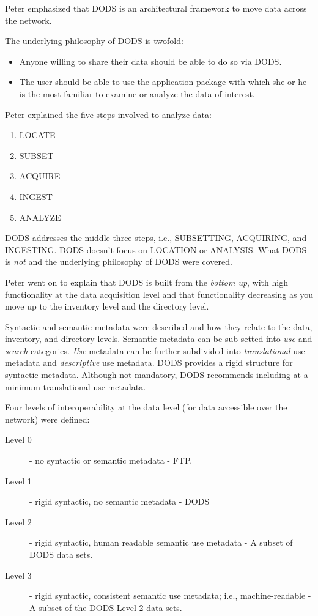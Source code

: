 Peter emphasized that DODS is an architectural framework to move data
across the network.

The underlying philosophy of DODS  is twofold:
\begin{itemize}
  \item Anyone willing to share their data should be able to do so via DODS.
  \item The user should be able to use the application package with
which she or he is the most familiar to examine or analyze the data of
interest.
\end{itemize}

Peter explained the five steps involved to analyze data:
\begin{enumerate}
\item LOCATE
\item SUBSET
\item ACQUIRE
\item INGEST
\item ANALYZE
\end{enumerate}

DODS addresses the middle three steps, i.e., SUBSETTING, ACQUIRING,
and INGESTING.  DODS doesn't focus on LOCATION or ANALYSIS.  What DODS
is \emph{not} and the underlying philosophy of DODS were covered.

Peter went on to explain that DODS is built from the \emph{bottom up},
with high functionality at the data acquisition level and that
functionality decreasing as you move up to the inventory level and the
directory level.

Syntactic and semantic metadata were described and how they relate to
the data, inventory, and directory levels.  Semantic metadata can be
sub-setted into \emph{use} and \emph{search} categories.  \emph{Use}
metadata can be further subdivided into \emph{translational} use
metadata and \emph{descriptive} use metadata.  DODS provides a rigid
structure for syntactic metadata.  Although not mandatory, DODS
recommends including at a minimum translational use metadata.

Four levels of interoperability at the data level (for data accessible
over the network) were defined:

\begin{description}
\item[Level 0] - no syntactic or semantic metadata - FTP.
\item[Level 1] - rigid syntactic, no semantic metadata - DODS
\item[Level 2] - rigid syntactic, human readable semantic use
  metadata - A subset of DODS data sets.
\item[Level 3] - rigid syntactic, consistent semantic use metadata;
  i.e., machine-readable - A subset of the DODS Level 2 data sets.
\end{description}

